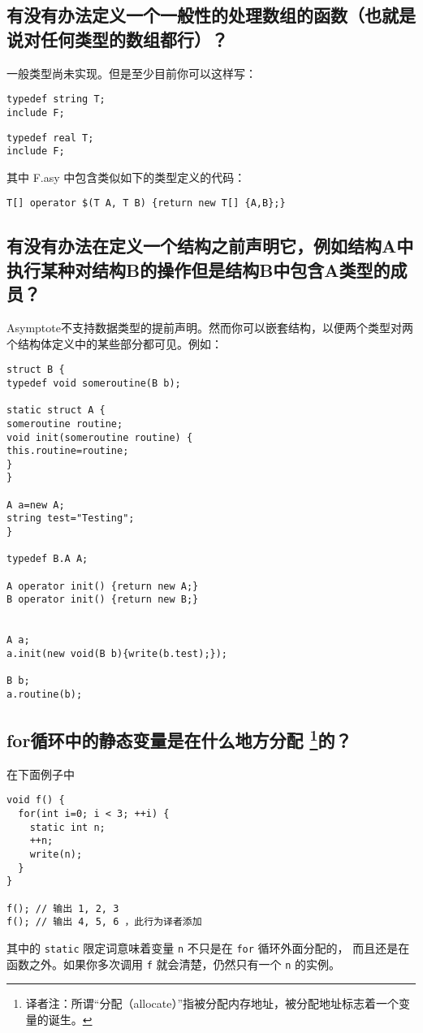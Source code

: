 \subsection{\label{Q7.5}有没有办法定义一个一般性的处理数组的函数（也就是说对任何类型的数组都行）？}
一般类型尚未实现。但是至少目前你可以这样写：
\begin{lstlisting}
typedef string T;
include F;
\end{lstlisting}
 
\begin{lstlisting}
typedef real T;
include F;
\end{lstlisting}
其中 F.asy 中包含类似如下的类型定义的代码：
\begin{lstlisting}
T[] operator $(T A, T B) {return new T[] {A,B};}
\end{lstlisting}

\subsection{\label{Q7.6}有没有办法在定义一个结构之前声明它，例如结构A中执行某种对结构B的操作但是结构B中包含A类型的成员？}
Asymptote不支持数据类型的提前声明。然而你可以嵌套结构，以便两个类型对两个结构体定义中的某些部分都可见。例如：

\begin{lstlisting}
struct B { 
typedef void someroutine(B b);
 
static struct A { 
someroutine routine;
void init(someroutine routine) { 
this.routine=routine;
} 
} 
 
A a=new A;
string test="Testing";
} 
 
typedef B.A A;
 
A operator init() {return new A;} 
B operator init() {return new B;} 
 
 
A a;
a.init(new void(B b){write(b.test);});
 
B b;
a.routine(b);
\end{lstlisting}

\subsection{\label{Q7.7}for循环中的静态变量是在什么地方分配
   \protect\footnote{译者注：所谓“分配（allocate）”指被分配内存地址，被分配地址标志着一个变量的诞生。}的？}

在下面例子中
\begin{lstlisting}
void f() { 
  for(int i=0; i < 3; ++i) { 
    static int n;
    ++n;
    write(n);
  }
} 

f(); // 输出 1, 2, 3
f(); // 输出 4, 5, 6 ，此行为译者添加
\end{lstlisting}
其中的 \verb|static| 限定词意味着变量 \verb|n| 不只是在 \verb|for| 循环外面分配的，
而且还是在函数之外。如果你多次调用 \verb|f| 就会清楚，仍然只有一个 \verb|n| 的实例。

